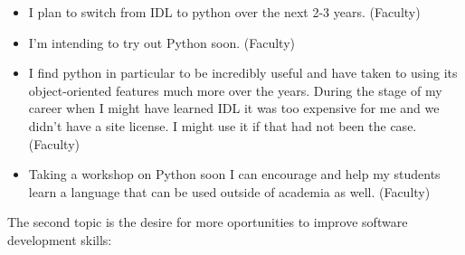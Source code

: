 \begin{itemize}
\item{I plan to switch from IDL to python over the next 2-3 years. (Faculty)}
\item{I'm intending to try out Python soon. (Faculty)}
\item{I find python in particular to be incredibly useful and have taken to using its object-oriented features much more over the years.  During the stage of my career when I might have learned IDL it was too expensive for me and we didn't have a site license.  I might use it if that had not been the case. (Faculty)}
\item{Taking a workshop on Python soon I can encourage and help my students learn a language that can be used outside of academia as well. (Faculty)}
\end{itemize}

The second topic is the desire for more oportunities to improve software development skills:
